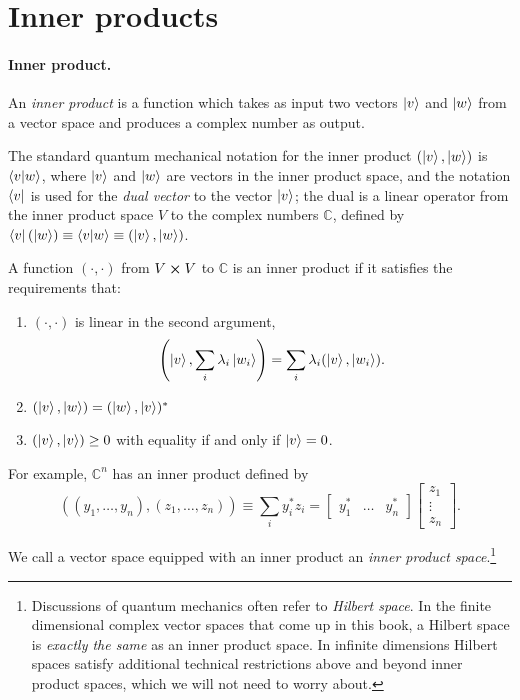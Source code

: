 \section{Inner products}

\paragraph{Inner product.} An \emph{inner product} is a function which takes as
input two vectors $\ket{v}$ and $\ket{w}$ from a vector space and produces a
complex number as output.

The standard quantum mechanical notation for the inner product $(\ket{v},
\ket{w})$ is $\braket{v}{w}$, where $\ket{v}$ and $\ket{w}$ are vectors in the
inner product space, and the notation $\bra{v}$ is used for the \emph{dual
vector} to the vector $\ket{v}$; the dual is a linear operator from the inner
product space $V$ to the complex numbers $\mathbb{C}$, defined by
$\bra{v}(\ket{w}) \equiv \braket{v}{w} \equiv (\ket{v}, \ket{w})$.

A function $(\cdot, \cdot)$ from $V \cross V$ to $\mathbb{C}$ is an inner
product if it satisfies the requirements that: \begin{enumerate}
  \item $(\cdot, \cdot)$ is linear in the second argument, \begin{equation}
      \left(\ket{v}, \sum_i \lambda_i\ket{w_i}\right) = \sum_i
      \lambda_i(\ket{v}, \ket{w_i}).
    \end{equation}
  \item $(\ket{v}, \ket{w}) = (\ket{w}, \ket{v})^*$
  \item $(\ket{v}, \ket{v}) \geq 0$ with equality if and only if $\ket{v} = 0$.
\end{enumerate}

For example, $\mathbb{C}^n$ has an inner product defined by \begin{equation}
  ((y_1, \ldots, y_n), (z_1, \ldots, z_n)) \equiv \sum_i y_i^*z_i =
    \begin{bmatrix}y_1^* & \dots & y_n^*\end{bmatrix}
    \begin{bmatrix}z_1 \\ \vdots \\ z_n\end{bmatrix}.
\end{equation}

We call a vector space equipped with an inner product an \emph{inner product
space}.\footnote{Discussions of quantum mechanics often refer to \emph{Hilbert
space}. In the finite dimensional complex vector spaces that come up in this
book, a Hilbert space is \emph{exactly the same} as an inner product space.
In infinite dimensions Hilbert spaces satisfy additional technical restrictions
above and beyond inner product spaces, which we will not need to worry about.}


